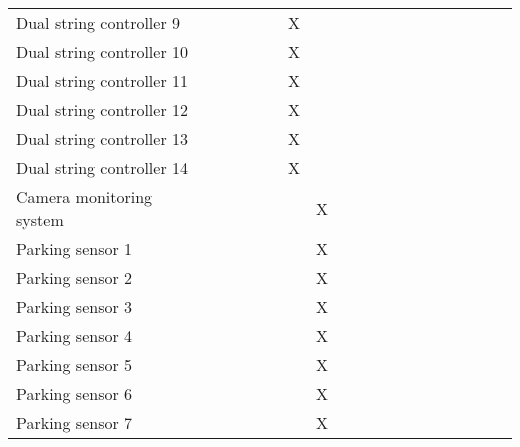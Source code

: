 \begin{table}[htb]
{\begin{tabular}{lllllllllllllllllll}
    \textcolor{mint}{Dual string controller 9}   &   &   &   &   &   & X &   &   &   &   &   & \multicolumn{1}{c|}{}  &   &   &   &   &   &   \\
    \rowcolor[gray]{0.925}
    \textcolor{mint}{Dual string controller 10}  &   &   &   &   &   & X &   &   &   &   &   & \multicolumn{1}{c|}{}  &   &   &   &   &   &   \\
    \textcolor{mint}{Dual string controller 11}  &   &   &   &   &   & X &   &   &   &   &   & \multicolumn{1}{c|}{}  &   &   &   &   &   &   \\
    \rowcolor[gray]{0.925}
    \textcolor{mint}{Dual string controller 12}  &   &   &   &   &   & X &   &   &   &   &   & \multicolumn{1}{c|}{}  &   &   &   &   &   &   \\
    \textcolor{mint}{Dual string controller 13}  &   &   &   &   &   & X &   &   &   &   &   & \multicolumn{1}{c|}{}  &   &   &   &   &   &   \\
    \rowcolor[gray]{0.925}
    \textcolor{mint}{Dual string controller 14}  &   &   &   &   &   & X &   &   &   &   &   & \multicolumn{1}{c|}{}  &   &   &   &   &   &   \\
    Camera monitoring system                     &   &   &   &   &   &   & X &   &   &   &   & \multicolumn{1}{c|}{}  &   &   &   &   &   &   \\
    \rowcolor[gray]{0.925}
    \textcolor{mint}{Parking sensor 1}           &   &   &   &   &   &   & X &   &   &   &   & \multicolumn{1}{c|}{}  &   &   &   &   &   &   \\
    \textcolor{mint}{Parking sensor 2}           &   &   &   &   &   &   & X &   &   &   &   & \multicolumn{1}{c|}{}  &   &   &   &   &   &   \\
    \rowcolor[gray]{0.925}
    \textcolor{mint}{Parking sensor 3}           &   &   &   &   &   &   & X &   &   &   &   & \multicolumn{1}{c|}{}  &   &   &   &   &   &   \\
    \textcolor{mint}{Parking sensor 4}           &   &   &   &   &   &   & X &   &   &   &   & \multicolumn{1}{c|}{}  &   &   &   &   &   &   \\
    \rowcolor[gray]{0.925}
    \textcolor{mint}{Parking sensor 5}           &   &   &   &   &   &   & X &   &   &   &   & \multicolumn{1}{c|}{}  &   &   &   &   &   &   \\
    \textcolor{mint}{Parking sensor 6}           &   &   &   &   &   &   & X &   &   &   &   & \multicolumn{1}{c|}{}  &   &   &   &   &   &   \\
    \rowcolor[gray]{0.925}
    \textcolor{mint}{Parking sensor 7}           &   &   &   &   &   &   & X &   &   &   &   & \multicolumn{1}{c|}{}  &   &   &   &   &   &   \\

\end{tabular}}
\end{table}
